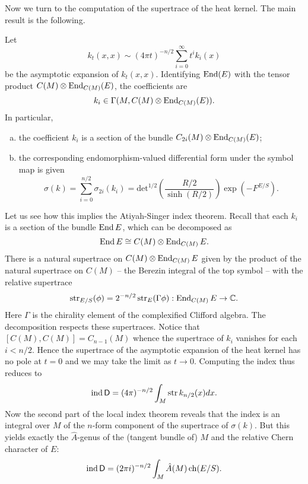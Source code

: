\documentclass{amsart}
\renewcommand\d{\mathsf{D}}
\begin{document}
Now we turn to the computation of the supertrace of the heat kernel. The main
result is the following.
\begin{theorem}
    Let
    \begin{equation*}
        k_t(x,x) \sim (4\pi t)^{-n/2} \sum_{i=0}^\infty t^ik_i(x)
    \end{equation*}
    be the asymptotic expansion of $k_t(x,x)$. Identifying $\operatorname{End}(E)$ with the tensor
    product $C(M)\otimes \operatorname{End}_{C(M)}(E)$, the coefficients are
    \begin{equation*}
        k_i \in \Gamma(M,C(M)\otimes\operatorname{End}_{C(M)}(E)).
    \end{equation*}
    In particular,
    \begin{enumerate}[(a)]
        \item the coefficient $k_i$ is a section of the bundle $C_{2i}(M)\otimes\operatorname{End}_{C(M)}(E)$;
        \item the corresponding endomorphism-valued differential form under the
            symbol map is given
            \begin{equation*}
                \sigma(k)=\sum_{i=0}^{n/2}\sigma_{2i}(k_i) = \mathrm{det}^{1/2}\left( \frac{R/2}{\sinh(R/2)} \right)
                \exp(-F^{E/S}).
            \end{equation*}
    \end{enumerate}
\end{theorem}

Let us see how this implies the Atiyah-Singer index theorem.
Recall that each $k_i$ is a section of the bundle $\operatorname{End} E$, which can be
decomposed as
\begin{equation*}
    \operatorname{End} E \cong C(M) \otimes \operatorname{End}_{C(M)} E.
\end{equation*}
There is a natural supertrace on $C(M)\otimes\operatorname{End}_{C(M)}E$ given by the product
of the natural supertrace on $C(M)$ -- the Berezin integral of the top symbol --
with the relative supertrace
\begin{equation*}
    \operatorname{str}_{E/S}(\phi) = 2^{-n/2}\operatorname{str}_E(\Gamma \phi): \operatorname{End}_{C(M)}E\to \mathbb{C}.
\end{equation*}
Here $\Gamma$ is the chirality element of the complexified Clifford algebra.
The decomposition respects these supertraces. Notice that $[C(M), C(M)]=C_{n-1}(M)$
whence the supertrace of $k_i$ vanishes for each $i<n/2$. Hence the supertrace
of the asymptotic expansion of the heat kernel has no pole at $t=0$ and we may
take the limit as $t\to0$. Computing the index thus reduces to
\begin{equation*}
    \ind \d = (4\pi)^{-n/2}\int_M \Str k_{n/2}(x) dx.
\end{equation*}
Now the second part of the local index theorem
reveals that the index is an integral over $M$ of the $n$-form component
of the supertrace of $\sigma(k)$. But this yields exactly the $\hat A$-genus
of the (tangent bundle of) $M$ and the relative Chern character of $E$:
\begin{equation*}
    \ind \d = (2\pi i)^{-n/2} \int_M \hat A(M) \ch(E/S).
\end{equation*}
\end{document}

